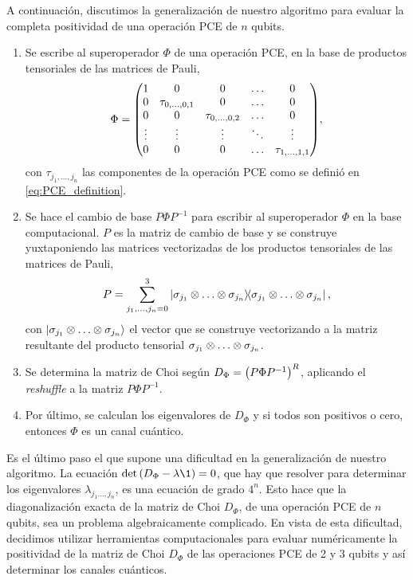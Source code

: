 A continuación, discutimos la generalización de nuestro algoritmo 
para evaluar la completa positividad de una operación PCE de $n$ qubits.  
\begin{enumerate}
\item Se escribe al superoperador $\Phi$ de una operación PCE, 
en la base de productos tensoriales de las matrices de Pauli, 
\begin{align}
\Phi=
\mqty(1&0&0&\hdots&0\\ 0&\tau_{0,\ldots,0,1}&0&\hdots&0\\
0&0&\tau_{0,\ldots,0,2}&\hdots&0\\
\vdots&\vdots&\vdots&\ddots&\vdots\\
0&0&0&\hdots&\tau_{1,\ldots,1,1}),
\end{align}
con $\tau_{j_1,\ldots,j_n}$ las componentes de la operación PCE como 
se definió en \eqref{eq:PCE_definition}.
\item Se hace el cambio de base $P\Phi P^{-1}$ para 
escribir al superoperador $\Phi$ en la base computacional. 
$P$ es la matriz de cambio de base y se construye yuxtaponiendo 
las matrices vectorizadas de los productos tensoriales de las matrices de Pauli,
\begin{align}
	P=\sum_{j_1,\ldots,j_n=0}^3
	\dyad{\sigma_{j_1}\ot\ldots\ot\sigma_{j_n}}{\sigma_{j_1}\ot\ldots\ot\sigma_{j_n}},
\end{align}
con $\ket{\sigma_{j_1}\otimes\ldots\otimes\sigma_{j_n}}$ el vector que 
se construye vectorizando a la matriz resultante del producto tensorial 
$\sigma_{j_1}\otimes\ldots\otimes\sigma_{j_n}$.

\item Se determina la matriz de Choi según $D_{\Phi}=\qty(P\Phi P^{-1})^R$, 
aplicando el \textit{reshuffle} a la matriz $P\Phi P^{-1}$. 

\item Por último, se calculan los eigenvalores de $D_{\Phi}$ y si
todos son positivos o cero, entonces $\Phi$ es un canal cuántico. 
\end{enumerate}
Es el último paso el que supone una dificultad en la generalización 
de nuestro algoritmo.
La ecuación $\det\qty(D_{\Phi}-\lambda \1)=0$, que hay que resolver
para determinar los eigenvalores $\lambda_{j_1\ldots,j_n}$,
es una ecuación de grado $4^n$. Esto hace que la diagonalización 
exacta de la matriz de Choi $D_{\Phi}$, de una operación PCE de $n$ 
qubits, sea un problema algebraicamente complicado. 
En vista de esta dificultad, decidimos utilizar herramientas computacionales
para evaluar numéricamente la positividad de la matriz de Choi $D_{\Phi}$ 
de las operaciones PCE de 2 y 3 qubits y así determinar los canales cuánticos. 

